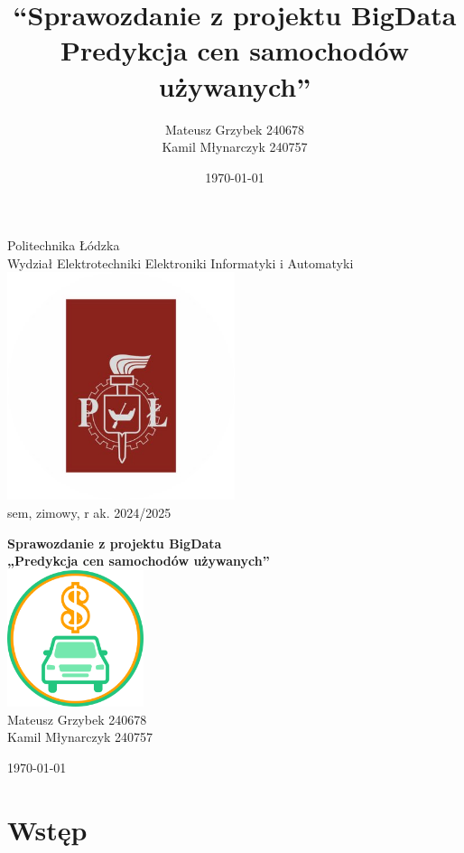 \documentclass[12pt, a4paper]{report}
\title{
``Sprawozdanie z projektu BigData\\ 
Predykcja cen samochodów używanych''
}
\author{
    Mateusz Grzybek 240678\\
    Kamil Młynarczyk  240757
}
\date{\today}
\begin{document}
\begin{titlepage}
    \centering

    {\Huge Politechnika Łódzka \\[0.5cm]}
    {\Large Wydział Elektrotechniki Elektroniki Informatyki i Automatyki \\[0cm]}
    \includegraphics[width=0.5\textwidth]{images/university_logo}
    {\\[0cm] sem, zimowy, r ak. 2024/2025 \\[1cm]}
    
    {\Large \textbf{
        Sprawozdanie z projektu BigData\\ 
        „Predykcja cen samochodów używanych” \\[0.2cm]
    }}
    \includegraphics[width=0.3\textwidth]{images/project_logo.png}
    {\\[0.3cm]}
    {\Large Mateusz Grzybek 240678 \\[0.2cm] Kamil Młynarczyk 240757 \\[1cm]}

    {\Large \today}
\end{titlepage}

\tableofcontents
\thispagestyle{empty}
\newpage

\chapter{Wstęp}
\end{document}
